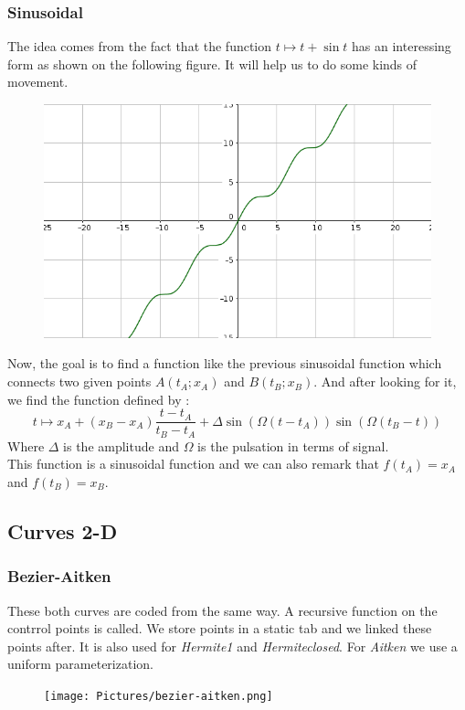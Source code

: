 \documentclass{article}
\begin{document}
\subsubsection*{Sinusoidal}
The idea comes from the fact that the function $t \longmapsto t+\sin t$ has an interessing form as shown
on the following figure. It will help us to do some kinds of movement.
\begin{figure}[H]
	\center
   \includegraphics[scale = 0.35]{Pictures/sin1.png}
\end{figure}
Now, the goal is to find a function like the previous sinusoidal function which connects two given points
$A(t_A;x_A)$ and $B(t_B;x_B)$.
And after looking for it, we find the function defined by :
\[
	t \longmapsto x_A + (x_B-x_A)\frac{t-t_A}{t_B-t_A} + \Delta\sin(\Omega(t-t_A))\sin(\Omega(t_B-t))
\]
Where $\Delta$ is the amplitude and $\Omega$ is the pulsation in terms of signal.\\
This function is a sinusoidal function and we can also remark that $f(t_A)=x_A$ and $f(t_B)=x_B$.
\subsection*{Curves 2-D}
\subsubsection*{Bezier-Aitken}
These both curves are coded from the same way. A recursive function on the contrrol points is called. We store points in a static tab and we linked these points after. It is also used for \textit{Hermite1} and \textit{Hermiteclosed}. For \textit{Aitken} we use a uniform parameterization. 
\begin{figure}[H]
   \texttt{[image: Pictures/bezier-aitken.png]}
\end{figure}
\end{document}
